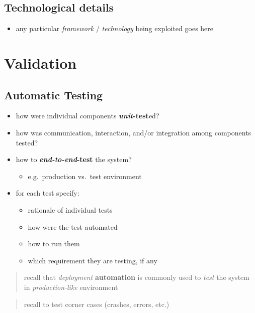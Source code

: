 \documentclass{scrartcl}
\begin{document}
\subsection{Technological details}\label{technological-details}

\begin{itemize}
  \item any particular \emph{framework} / \emph{technology} being exploited
  goes here
\end{itemize}

\section{Validation}\label{validation}

\subsection{Automatic Testing}\label{automatic-testing}

\begin{itemize}
  \item how were individual components \textbf{\emph{unit}-test}ed?
  \item how was communication, interaction, and/or integration among
  components tested?
  \item how to \textbf{\emph{end-to-end}-test} the system?

  \begin{itemize}
    \item e.g.~production vs.~test environment
  \end{itemize}
  \item for each test specify:

  \begin{itemize}
    \item rationale of individual tests
    \item how were the test automated
    \item how to run them
    \item which requirement they are testing, if any
  \end{itemize}
\end{itemize}

\begin{quote}
recall that \emph{deployment} \textbf{automation} is commonly used to
\emph{test} the system in \emph{production-like} environment
\end{quote}

\begin{quote}
recall to test corner cases (crashes, errors, etc.)
\end{quote}
\end{document}
